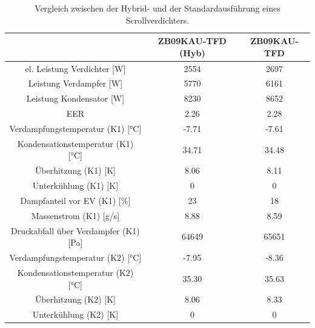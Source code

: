 \begin{table}[h!]
\centering
\caption{Vergleich zwischen der Hybrid- und der Standardausführung eines Scrollverdichters.}
\label{tab:VergleichVerdichter}
\begin{tabular}{|ccc|}
\hline

                                                                & ZB09KAU-TFD (Hyb) & ZB09KAU-TFD \\ \hline
\multicolumn{1}{|c|}{el. Leistung Verdichter {[}W{]}}           & \multicolumn{1}{c|}{2554}  & 2697         \\
\multicolumn{1}{|c|}{Leistung Verdampfer {[}W{]}}               & \multicolumn{1}{c|}{5770}  & 6161         \\
\multicolumn{1}{|c|}{Leistung Kondensator {[}W{]}}             & \multicolumn{1}{c|}{8230}  & 8652         \\
\multicolumn{1}{|c|}{EER}                                       & \multicolumn{1}{c|}{2.26}  & 2.28         \\ \hline
\multicolumn{1}{|c|}{Verdampfungstemperatur (K1) {[}°C{]}}      & \multicolumn{1}{c|}{-7.71} & -7.61        \\
\multicolumn{1}{|c|}{Kondensationstemperatur (K1) {[}°C{]}}    & \multicolumn{1}{c|}{34.71} & 34.48        \\
\multicolumn{1}{|c|}{Überhitzung (K1) {[}K{]}}                  & \multicolumn{1}{c|}{8.06}  & 8.11         \\
\multicolumn{1}{|c|}{Unterkühlung (K1) {[}K{]}}                 & \multicolumn{1}{c|}{0}     & 0            \\
\multicolumn{1}{|c|}{Dampfanteil vor EV (K1) {[}\%{]}}          & \multicolumn{1}{c|}{23}    & 18           \\
\multicolumn{1}{|c|}{Massenstrom (K1) {[}g/s{]}}                & \multicolumn{1}{c|}{8.88}  & 8.59         \\
\multicolumn{1}{|c|}{Druckabfall über Verdampfer (K1) {[}Pa{]}} & \multicolumn{1}{c|}{64649} & 65651        \\ \hline
\multicolumn{1}{|c|}{Verdampfungstemperatur (K2) {[}°C{]}}      & \multicolumn{1}{c|}{-7.95} & -8.36        \\
\multicolumn{1}{|c|}{Kondensationstemperatur (K2) {[}°C{]}}    & \multicolumn{1}{c|}{35.30} & 35.63        \\
\multicolumn{1}{|c|}{Überhitzung (K2) {[}K{]}}                  & \multicolumn{1}{c|}{8.06}  & 8.33         \\
\multicolumn{1}{|c|}{Unterkühlung (K2) {[}K{]}}                 & \multicolumn{1}{c|}{0}     & 0            \\

\end{tabular}
\end{table}

